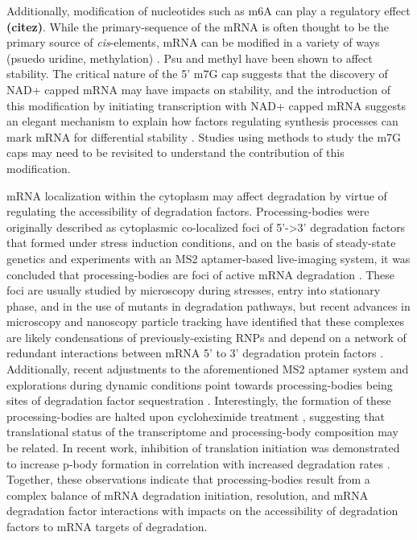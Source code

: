 Additionally, modification of
nucleotides such as m6A can play a regulatory effect \textbf{(citez)}.
While the primary-sequence of the mRNA is often thought to be the
primary source of \textit{cis}-elements,
mRNA can be modified in a variety of ways
(psuedo uridine, methylation)
\parencite{walters2017identification}.
Psu and methyl have been shown to affect stability.
The critical nature of the 5' m7G cap suggests that the
discovery of NAD+ capped mRNA may have impacts on
stability, and the introduction of this modification by
initiating transcription with NAD+ capped mRNA suggests an
elegant mechanism to explain how factors regulating synthesis 
processes can mark mRNA for differential 
stability \parencite{walters2017identification}.
Studies using methods to study the m7G caps may need to be revisited
to understand the contribution of this modification.

mRNA
localization within the cytoplasm may affect degradation by virtue of
regulating the accessibility of degradation factors. Processing-bodies
were originally described as cytoplasmic co-localized foci of 5’->3’
degradation factors that formed under stress induction conditions, and
on the basis of steady-state genetics and experiments with an MS2
aptamer-based live-imaging system, it was concluded that
processing-bodies are foci of active mRNA degradation 
\parencite{sheth2003decapping}.
These foci are usually studied by microscopy during
stresses, entry into stationary phase, and in the use of mutants in
degradation pathways, but recent advances in microscopy and nanoscopy
particle tracking have identified that these complexes are likely
condensations of previously-existing RNPs and depend on a network of
redundant interactions between mRNA 5’ to 3’ degradation protein
factors 
\parencite{lui2014granules,rao2017numerous}.
Additionally, recent
adjustments to the aforementioned MS2 aptamer system and explorations
during dynamic conditions point towards processing-bodies being sites
of degradation factor sequestration 
\parencite{huch2017mrna,tutucci2017improved}.
Interestingly, the formation of these processing-bodies are
halted upon cycloheximide treatment 
\parencite{sheth2003decapping},
suggesting that translational status of the transcriptome and
processing-body composition may be related. In recent work, inhibition
of translation initiation was demonstrated to increase p-body
formation in correlation with increased degradation rates 
\parencite{chan2017non}. 
Together, these observations indicate that processing-bodies
result from a complex balance of mRNA degradation initiation,
resolution, and mRNA degradation factor interactions with impacts on
the accessibility of degradation factors to mRNA targets of
degradation.  

